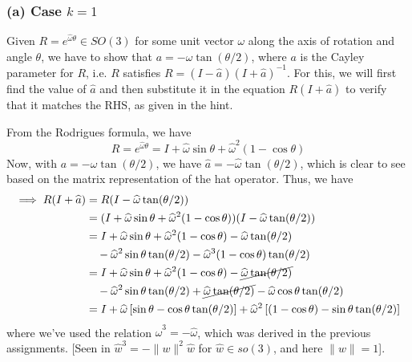 \subsubsection*{(a) Case \( k=1 \)}

Given \( R = e^{\widehat{\omega} \theta} \in SO(3) \) for some unit vector \( \omega \) along the axis of rotation and angle \( \theta \), we have to show that \( a = -\omega \tan(\theta / 2) \), where \( a \) is the Cayley parameter for \( R \), i.e. \( R \) satisfies \( R = (I - \widehat{a}) {(I + \widehat{a})}^{-1} \).
For this, we will first find the value of \( \widehat{a} \) and then substitute it in the equation \( R(I + \widehat{a}) \) to verify that it matches the RHS, as given in the hint.

From the Rodrigues formula, we have
\begin{equation*}
    R = e^{\widehat{\omega} \theta} = I + \widehat{\omega} \sin \theta + \widehat{\omega}^{2} (1 - \cos \theta)
\end{equation*}
Now, with \( a = -\omega \tan(\theta / 2) \), we have \( \widehat{a} = -\widehat{\omega} \tan(\theta / 2) \), which is clear to see based on the matrix representation of the hat operator.
Thus, we have
\begin{align*}
    \implies
    R(I + \widehat{a})
     & =
    R(I - \widehat{\omega} \tan(\theta / 2))
    \\ & =
    (I + \widehat{\omega} \sin \theta + \widehat{\omega}^{2} (1 - \cos \theta))(I - \widehat{\omega} \tan(\theta / 2))
    \\ & =
    I + \widehat{\omega} \sin \theta + \widehat{\omega}^{2} (1 - \cos \theta) - \widehat{\omega} \tan(\theta / 2)
    \\ & \quad
    - \widehat{\omega}^{2} \sin \theta \tan(\theta / 2) - \widehat{\omega}^{3} (1 - \cos \theta) \tan(\theta / 2)
    \\ & =
    I + \widehat{\omega} \sin \theta + \widehat{\omega}^{2} (1 - \cos \theta) - \cancel{\widehat{\omega} \tan(\theta / 2)}
    \\ & \quad
    - \widehat{\omega}^{2} \sin \theta \tan(\theta / 2) + \cancel{\widehat{\omega} \tan(\theta / 2)} - \widehat{\omega} \cos \theta \tan(\theta / 2)
    \\ & =
    I + \widehat{\omega} \left[ \sin \theta - \cos \theta \tan(\theta / 2) \right] + \widehat{\omega}^{2} \left[(1 - \cos \theta) - \sin \theta \tan(\theta / 2) \right]
\end{align*}
where we've used the relation \( \widehat{\omega}^{3} = -\widehat{\omega} \), which was derived in the previous assignments.
[Seen in \( \hat{w}^{3}=-\|w\|^{2} \hat{w} \) for \( \hat{w} \in so(3) \), and here \( \|w\|=1 \)].


